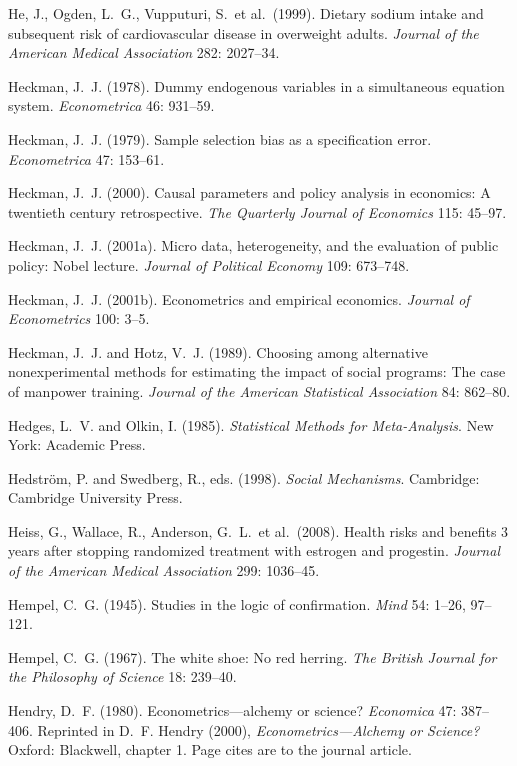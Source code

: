 \smallskip\noindent
He, J., Ogden, L.~G., Vupputuri, S.~et al.~(1999).
Dietary sodium intake and subsequent risk of cardiovascular disease in overweight adults.
{\it Journal of the American Medical Association\/} 282: 2027--34.

\smallskip\noindent
Heckman, J.~J. (1978).
Dummy endogenous variables in a simultaneous equation system.
{\it Econometrica\/} 46: 931--59.

\smallskip\noindent
Heckman, J.~J. (1979).
Sample selection bias as a specification error.
{\it Econometrica\/} 47: 153--61.

\smallskip\noindent
Heckman, J.~J. (2000).
Causal parameters and policy analysis in economics: A twentieth century retrospective.
{\it The Quarterly Journal of Economics\/} 115: 45--97.

\smallskip\noindent
Heckman, J.~J. (2001a).
Micro data, heterogeneity, and the evaluation of public policy: Nobel lecture.
{\it Journal of Political Economy\/} 109: 673--748.

\smallskip\noindent
Heckman, J.~J. (2001b).
Econometrics and empirical economics.
{\it Journal of Econometrics\/} 100: 3--5.

\smallskip\noindent
Heckman, J.~J. and Hotz, V.~J. (1989).
Choosing among alternative nonexperimental methods for estimating the impact of social programs:
The case of manpower training.
{\it Journal of the American Statistical Association\/} 84: 862--80.

\smallskip\noindent
Hedges, L.~V. and Olkin, I. (1985).
{\it Statistical Methods for Meta-Analysis\/}.
New York: Academic Press.

\smallskip\noindent
Hedstr\"om, P. and Swedberg, R., eds. (1998).
{\it Social Mechanisms\/}.
Cambridge: Cambridge University Press.

\smallskip\noindent
Heiss, G., Wallace, R., Anderson, G.~L.~et al.~(2008).
Health risks and benefits 3 years after stopping randomized treatment with estrogen and progestin.
{\it Journal of the American Medical Association\/} 299: 1036--45.

\smallskip\noindent
Hempel, C.~G. (1945).
Studies in the logic of confirmation.
{\it Mind\/} 54: 1--26, 97--121.

\smallskip\noindent
Hempel, C.~G. (1967).
The white shoe: No red herring.
{\it The British Journal for the Philosophy of Science\/} 18: 239--40.

\smallskip\noindent
Hendry, D.~F. (1980).
Econometrics---alchemy or science?
{\it Economica\/} 47: 387--406.
Reprinted in D.~F. Hendry (2000), {\it Econometrics---Alchemy or Science?\/}
Oxford: Blackwell, chapter 1. Page cites are to the journal article.

